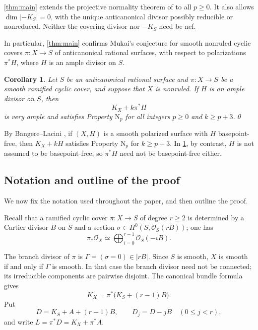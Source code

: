 \documentclass[11pt,reqno]{amsart}
\numberwithin{equation}{section}
\newtheorem{corollary}[corollary]{Corollary}
\theoremstyle{remark}
\newcommand{\sshf}[1]{\mathcal{O}_{#1}}
\newcommand{\iso}{\simeq}
\newcommand{\NP}{\mathrm N}
\begin{document}
\cref{thm:main} extends the projective normality theorem of \cite{Song}
to all \(p\geq0\). It also allows $\dim |-K_S|=0$, with the unique anticanonical divisor possibly reducible or nonreduced. Neither the covering divisor nor
\(-K_S\) need be nef.

In particular, \cref{thm:main} confirms Mukai's conjecture
\cite[Conjecture~4.2]{EL93} for smooth nonruled cyclic covers
\(\pi\colon X\to S\) of anticanonical rational surfaces,
with respect to polarizations \(\pi^*H\), where \(H\) is
an ample divisor on \(S\).
\begin{corollary}
\label{cor:Song-extension}
Let \(S\) be an anticanonical rational surface and
\(\pi\colon X\to S\) be a smooth ramified cyclic
cover, and suppose that \(X\) is nonruled. If \(H\) is an ample divisor on \(S\), then
\[
 K_X+k\pi^*H
\]
is very ample and satisfies Property \(\NP_p\) for all integers \(p\ge 0\) and
\(k\geq p+3\).\qed
\end{corollary}

By Bangere--Lacini \cite[Theorem 1.2]{BangereLacini}, if $(X, H)$ is a smooth polarized surface with $H$ basepoint-free, then \(K_X+kH\) satisfies Property $\NP_p$ for $k\ge p+3$. In \cref{cor:Song-extension}, by contrast, $H$ is not assumed to be basepoint-free, so $\pi^*H$ need not be basepoint-free either.

\subsection{Notation and outline of the proof}

We now fix the notation used throughout the paper, and then outline the proof.

Recall that a ramified cyclic cover \(\pi\colon X\to S\) of degree $r\ge 2$ is determined by a Cartier divisor \(B\) on \(S\) and a section \(\sigma\in H^0(S,\sshf{S}(rB))\); one has
\begin{equation}\label{eq:cyclic-algebra}
 \pi_*\sshf{X}\iso \bigoplus_{i=0}^{r-1}\sshf{S}(-iB).
\end{equation}


The branch divisor of $\pi$ is $\Gamma=(\sigma=0)\in|rB|$. Since $S$ is smooth, $X$ is smooth if and only if \(\Gamma\) is smooth. In that case the branch divisor need
not be connected; its irreducible components are pairwise disjoint.
The canonical bundle formula gives
\[
 K_X=\pi^*\bigl(K_S+(r-1)B\bigr).
\]
Put
\begin{equation}\label{eq:notation}
 D=K_S+A+(r-1)B,\qquad D_j=D-jB
 \quad(0\leq j<r),
\end{equation}
and write \(L=\pi^*D=K_X+\pi^*A\).
\end{document}
